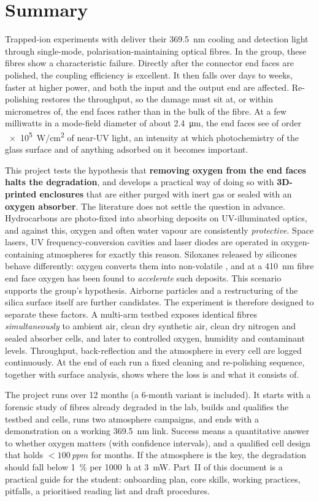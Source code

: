 \section{Summary}\label{sec:summary}

Trapped-ion experiments with \Ybion{} deliver their \SI{369.5}{nm} cooling and detection light through
single-mode, polarisation-maintaining optical fibres. In the group, these fibres show a characteristic
failure. Directly after the connector end faces are polished, the coupling efficiency is excellent. It
then falls over days to weeks, faster at higher power, and both the input and the output end are
affected. Re-polishing restores the throughput, so the damage must sit at, or within micrometres of, the
end faces rather than in the bulk of the fibre. At a few milliwatts in a mode-field diameter of
about \SI{2.4}{\micro m}, the end faces see of order \SI{e5}{W/cm^2} of near-UV light, an
intensity at which photochemistry of the glass surface and of anything adsorbed on it becomes
important.

This project tests the hypothesis that \textbf{removing oxygen from the end faces halts the degradation},
and develops a practical way of doing so with \textbf{3D-printed enclosures} that are either purged with
inert gas or sealed with an \textbf{oxygen absorber}. The literature does not settle the question in advance. Hydrocarbons are photo-fixed into
absorbing deposits on UV-illuminated optics, and against this, oxygen and often water vapour are consistently
\emph{protective}. Space lasers, UV frequency-conversion cavities and laser diodes are operated in
oxygen-containing atmospheres for exactly this reason. Siloxanes released by silicones behave
differently: oxygen converts them into non-volatile , and at a \SI{410}{nm} fibre end face oxygen
has been found to \emph{accelerate} such deposits. This scenario supports the group's hypothesis.
Airborne particles and a restructuring of the silica surface itself are further candidates. The
experiment is therefore designed to separate these factors. A multi-arm testbed exposes identical
fibres \emph{simultaneously} to ambient air, clean dry synthetic air, clean dry nitrogen and sealed
absorber cells, and later to controlled oxygen, humidity and contaminant levels. Throughput,
back-reflection and the atmosphere in every cell are logged continuously. At the end of each run a fixed
cleaning and re-polishing sequence, together with surface analysis, shows where the loss is and what
it consists of.

The project runs over 12 months (a 6-month variant is included). It starts with a forensic study of
fibres already degraded in the lab, builds and qualifies the testbed and cells, runs two atmosphere
campaigns, and ends with a demonstration on a working \SI{369.5}{nm} link. Success means a quantitative
answer to whether oxygen matters (with confidence intervals), and a qualified cell design that holds
$<\SI{100}{ppm}$ \Oxy{} for months. If the atmosphere is the key, the degradation should fall below
\SI{1}{\percent} per \SI{1000}{h} at \SI{3}{mW}. Part~II of this document is a practical guide for the
student: onboarding plan, core skills, working practices, pitfalls, a prioritised reading list and
draft procedures.
